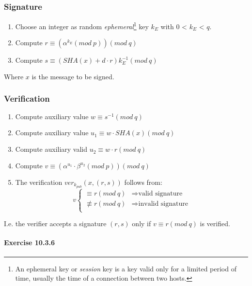 \documentclass{article}
\begin{document}
	\subsubsection{Signature}

	\begin{enumerate}
		\item Choose an integer as random \emph{ephemeral}\footnote{An ephemeral
			key or \emph{session} key is a key valid only for a limited period
			of time, usually the time of a connection between two hosts.} key 
			$k_{E}$ with 0 < $k_{E}$ < $q$.
		\item Compute $r \equiv (\alpha ^{k_{E}} (mod ~ p)) (mod ~ q)$
		\item Compute $s \equiv (SHA(x) + d \cdot r) k^{-1}_{E} (mod ~ q)$
	\end{enumerate}

	Where $x$ is the message to be signed.

	\subsubsection{Verification}

	\begin{enumerate}
		\item Compute auxiliary value $w \equiv s^{-1} (mod ~ q)$
		\item Compute auxiliary value $u_{1} \equiv w \cdot SHA(x) (mod ~ q)$
		\item Compute auxiliary valid $u_{2} \equiv w \cdot r (mod ~ q)$
		\item Compute $v \equiv (\alpha^{u_{1}} \cdot \beta^{u_{2}} (mod ~ p) )(mod ~ q)$
		\item The verification $ver_{k_{pub}}(x, (r, s))$ follows from:
			$$
			v \begin{cases}
				\equiv r (mod ~ q) & \Rightarrow \text{valid signature} \\
				\not\equiv r (mod ~ q) & \Rightarrow \text{invalid signature} \\
			\end{cases}
			$$
	\end{enumerate}

	I.e. the verifier accepts a signature $(r, s)$ only if $v \equiv r (mod  ~
	q)$ is verified.

	\paragraph{Exercise 10.3.6}
\end{document}
